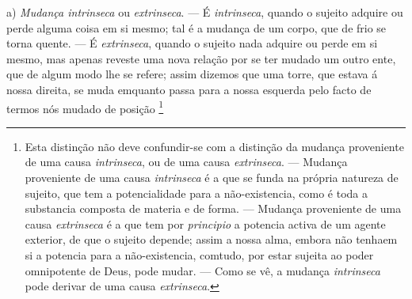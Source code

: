 a) \emph{Mudança intrinseca} ou \emph{extrinseca}. --- É \emph{intrinseca}, quando o sujeito adquire ou perde alguma coisa em si mesmo; tal é a mudança de um corpo, que de frio se torna quente. --- É \emph{extrinseca}, quando o sujeito nada adquire ou perde em si mesmo, mas apenas reveste uma nova relação por se ter mudado um outro ente, que de algum modo lhe se refere; assim dizemos que uma torre, que estava á nossa direita, se muda emquanto passa para a nossa esquerda pelo facto de termos nós mudado de posição \footnote{Esta distinção não deve confundir-se com a distinção da mudança proveniente de uma causa \emph{intrinseca}, ou de uma causa \emph{extrinseca}. --- Mudança proveniente de uma causa \emph{intrinseca} é a que se funda na própria natureza de sujeito, que tem a potencialidade para a não-existencia, como é toda a substancia composta de materia e de forma. --- Mudança proveniente de uma causa \emph{extrinseca} é a que tem por \emph{principio} a potencia activa de um agente exterior, de que o sujeito depende; assim a nossa alma, embora não tenhaem si a potencia para a não-existencia, comtudo, por estar sujeita ao poder omnipotente de Deus, pode mudar. --- Como se vê, a mudança \emph{intrinseca} pode derivar de uma causa \emph{extrinseca}.}
